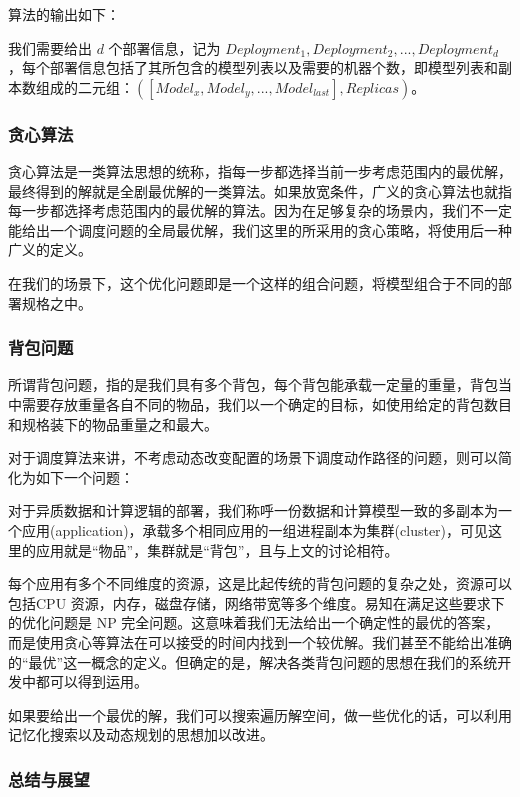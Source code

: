 算法的输出如下：

我们需要给出 $d$ 个部署信息，记为 $Deployment_1,Deployment_2,...,Deployment_d$，每个部署信息包括了其所包含的模型列表以及需要的机器个数，即模型列表和副本数组成的二元组：$([Model_x,Model_y,...,Model_{last}],Replicas)$。

\subsubsection{贪心算法}

贪心算法是一类算法思想的统称，指每一步都选择当前一步考虑范围内的最优解，最终得到的解就是全剧最优解的一类算法。如果放宽条件，广义的贪心算法也就指每一步都选择考虑范围内的最优解的算法。因为在足够复杂的场景内，我们不一定能给出一个调度问题的全局最优解，我们这里的所采用的贪心策略，将使用后一种广义的定义。

在我们的场景下，这个优化问题即是一个这样的组合问题，将模型组合于不同的部署规格之中。

\subsubsection{背包问题}

所谓背包问题，指的是我们具有多个背包，每个背包能承载一定量的重量，背包当中需要存放重量各自不同的物品，我们以一个确定的目标，如使用给定的背包数目和规格装下的物品重量之和最大。

对于调度算法来讲，不考虑动态改变配置的场景下调度动作路径的问题，则可以简化为如下一个问题：

对于异质数据和计算逻辑的部署，我们称呼一份数据和计算模型一致的多副本为一个应用(application)，承载多个相同应用的一组进程副本为集群(cluster)，可见这里的应用就是“物品”，集群就是“背包”，且与上文的讨论相符。

每个应用有多个不同维度的资源，这是比起传统的背包问题的复杂之处，资源可以包括CPU 资源，内存，磁盘存储，网络带宽等多个维度。易知在满足这些要求下的优化问题是 NP 完全问题。这意味着我们无法给出一个确定性的最优的答案，而是使用贪心等算法在可以接受的时间内找到一个较优解。我们甚至不能给出准确的“最优”这一概念的定义。但确定的是，解决各类背包问题的思想在我们的系统开发中都可以得到运用。

如果要给出一个最优的解，我们可以搜索遍历解空间，做一些优化的话，可以利用记忆化搜索以及动态规划的思想加以改进。 %

\subsubsection{总结与展望}

